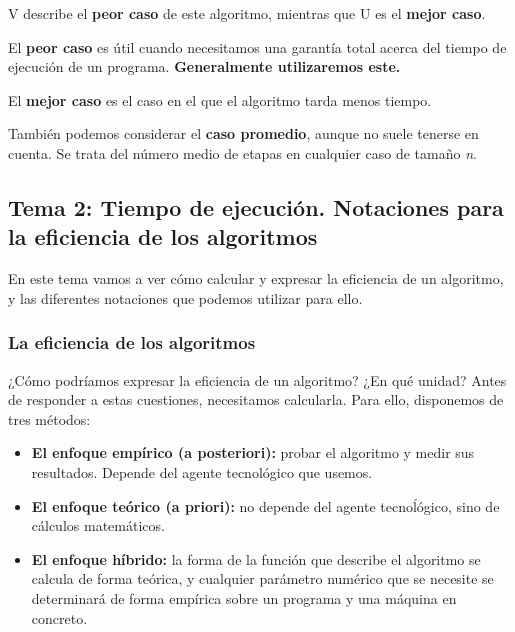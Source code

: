 \documentclass[11pt,a4paper]{article}
\begin{document}
\medskip

V describe el \textbf{peor caso} de este algoritmo, mientras que U es el \textbf{mejor caso}. 

\medskip

El \textbf{peor caso} es útil cuando necesitamos una garantía total acerca del tiempo de ejecución de un programa. \textbf{Generalmente utilizaremos este.}

\medskip

El \textbf{mejor caso} es el caso en el que el algoritmo tarda menos tiempo.

\medskip

También podemos considerar el \textbf{caso promedio}, aunque no suele tenerse en cuenta. Se trata del número medio de etapas en cualquier caso de tamaño \textit{n}.

\newpage

\subsection{Tema 2: Tiempo de ejecución. Notaciones para la eficiencia de los algoritmos}

En este tema vamos a ver cómo calcular y expresar la eficiencia de un algoritmo, y las diferentes notaciones que podemos utilizar para ello. 

\subsubsection{La eficiencia de los algoritmos}

¿Cómo podríamos expresar la eficiencia de un algoritmo? ¿En qué unidad? Antes de responder a estas cuestiones, necesitamos calcularla. Para ello, disponemos de tres métodos:

\begin{itemize}
\item \textbf{El enfoque empírico (a posteriori):} probar el algoritmo y medir sus resultados. Depende del agente tecnológico que usemos.

\item \textbf{El enfoque teórico (a priori):} no depende del agente tecnoĺógico, sino de cálculos matemáticos.

\item \textbf{El enfoque híbrido: } la forma de la función que describe el algoritmo se calcula de forma teórica, y cualquier parámetro numérico que se necesite se determinará de forma empírica sobre un programa y una máquina en concreto.
 
\end{itemize}
\end{document}
